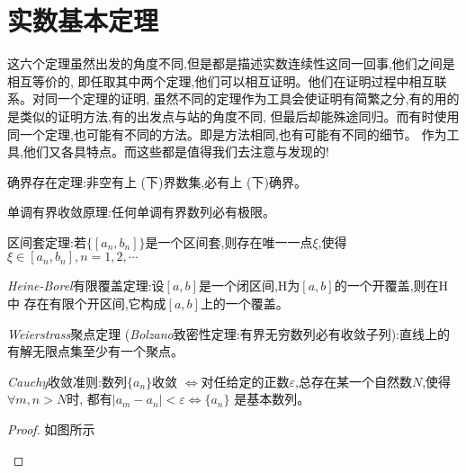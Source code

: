 \newpage
\section{实数基本定理}
这六个定理虽然出发的角度不同,但是都是描述实数连续性这同一回事,他们之间是相互等价的,
即任取其中两个定理,他们可以相互证明。他们在证明过程中相互联系。对同一个定理的证明,
虽然不同的定理作为工具会使证明有简繁之分,有的用的是类似的证明方法,有的出发点与站的角度不同,
但最后却能殊途同归。而有时使用同一个定理,也可能有不同的方法。即是方法相同,也有可能有不同的细节。
作为工具,他们又各具特点。而这些都是值得我们去注意与发现的!   

\vspace*{1em}
\begin{theorem}[实数基本定理]
    \noindent{} 确界存在定理:非空有上 (下)界数集,必有上 (下)确界。%

    \noindent{} 单调有界收敛原理:任何单调有界数列必有极限。

    \noindent{} 区间套定理:若$\{\left [ a_n,b_n \right ]\}$是一个区间套,则存在唯一一点$\xi$,使得$\xi\in \left [ a_n,b_n \right ] ,n=1,2,\cdots $

    \noindent{} \textit{Heine-Borel}有限覆盖定理:设$\left [ a,b \right ]$是一个闭区间,H为$\left [ a,b \right ]$的一个开覆盖,则在H中
    存在有限个开区间,它构成$\left [ a,b \right ]$上的一个覆盖。

    \noindent{} \textit{Weierstrass}聚点定理 (\textit{Bolzano}致密性定理:有界无穷数列必有收敛子列):直线上的有解无限点集至少有一个聚点。

    \noindent{} \textit{Cauchy}收敛准则:数列$\{a_n\}$收敛 $\Longleftrightarrow$对任给定的正数$\varepsilon$,总存在某一个自然数$N$,使得$\forall m,n>N$时,
    都有$\left| a_m-a_n \right| < \varepsilon\Longleftrightarrow \{a_n\}$ 是基本数列。
\end{theorem}

\begin{proof}
如图所示
\begin{center}
\end{center}
\end{proof}

\clearpage